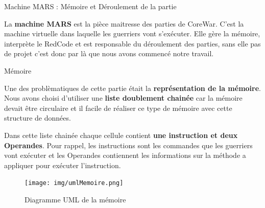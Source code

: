 \documentclass[a4paper, 10pt]{article}
\begin{document}
    \begin{section}{Machine MARS : Mémoire et Déroulement de la partie}\label{sec:machineMARS}
        \par
            La \textbf{machine MARS} est la pièce maitresse des parties de CoreWar. C'est la machine virtuelle dans laquelle les guerriers vont s'exécuter. Elle gère la mémoire, interprète le RedCode et est responsable du déroulement des parties, sans elle pas de projet c'est donc par là que nous avons commencé notre travail. 
            \medskip
        
        \begin{subsection}{Mémoire}\label{sec:mem}
            
            \par
                Une des problèmatiques de cette partie était la \textbf{représentation de la mémoire}.
                Nous avons choisi d'utiliser une \textbf{liste doublement chainée} car la mémoire devait être circulaire et il facile de réaliser ce type de mémoire avec cette structure de données.
                \smallskip
            \par
                Dans cette liste chainée chaque cellule contient \textbf{une instruction et deux Operandes}. Pour rappel, les instructions sont les commandes que les guerriers vont exécuter et les Operandes contiennent les informations sur la méthode a appliquer pour exécuter l'instruction. 
                \medskip
        \end{subsection}

        \begin{figure}[h]
            \texttt{[image: img/umlMemoire.png]}
            \centering
            \label{fig:umlMemoire}
            \caption{Diagramme UML de la mémoire}
        \end{figure}


\end{section}
\end{document}
